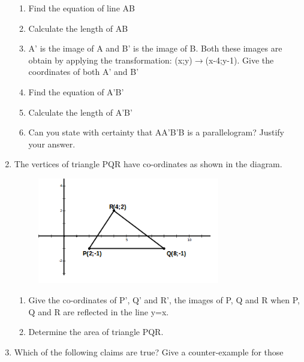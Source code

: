 \begin{enumerate}[noitemsep, label=\textbf{\arabic*}. ]
\begin{figure}[H]
\begin{center}
\vspace{2pt}
\vspace{.1in}
\end{center}
\end{figure}       \begin{enumerate}[noitemsep, label=\textbf{\alph*}. ] 
\item Find the equation of line AB \item Calculate the length of AB\item  A' is
the image of A and B' is the image of B. Both these images are obtain by
applying the transformation: (x;y)$\to $(x-4;y-1). Give the coordinates of both
A' and B'\item Find the equation of A'B'\item Calculate the length of A'B'\item
Can you state with certainty that AA'B'B is a parallelogram? Justify your
answer.\end{enumerate}
    \item The vertices of triangle PQR have co-ordinates as shown in the
diagram.
\setcounter{subfigure}{0}
\begin{figure}[H] %
\begin{center}
\label{m39358*id743344!!!underscore!!!media}\label{
m39358*id743344!!!underscore!!!printimage}\includegraphics[width=300px]{
col11306.imgs/m39358_mg10c14_6.png} %
\vspace{2pt}
\vspace{.1in}
\end{center}
\end{figure}       
\begin{enumerate}[noitemsep, label=\textbf{\alph*}. ] 
\item Give the co-ordinates of  P', Q' and R', the images of P, Q and R when P,
Q and R are reflected in the line y=x.\item Determine the area of triangle
PQR.\end{enumerate}
\item Which of the following claims are true? Give a counter-example for those

\end{enumerate}

